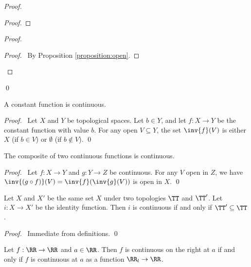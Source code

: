 \begin{proof}
\begin{proof}
    \end{proof}
    \begin{proof}
        \qedstep
        \begin{proof}
            \pf\ By Proposition \ref{proposition:open}.
        \end{proof}
    \end{proof}
    \qed
\end{proof}

\begin{theorem}
    A constant function is continuous.
\end{theorem}

\begin{proof}
    \pf\ Let $X$ and $Y$ be topological spaces. Let $b \in Y$, and let $f : X \rightarrow Y$ be the constant
    function with value $b$. For any open $V \subseteq Y$, the set $\inv{f}(V)$ is either $X$ (if $b \in V$)
    or $\emptyset$ (if $b \notin V$). \qed
\end{proof}

\begin{theorem}
    \label{theorem:continuous_composite}
    The composite of two continuous functions is continuous.
\end{theorem}

\begin{proof}
    \pf\ Let $f : X \rightarrow Y$ and $g : Y \rightarrow Z$ be continuous. For any $V$ open in $Z$,
    we have $\inv{(g \circ f)}(V) = \inv{f}(\inv{g}(V))$ is open in $X$. \qed
\end{proof}

\begin{proposition}
    Let $X$ and $X'$ be the same set $X$ under two topologies $\TT$ and $\TT'$. Let $i : X \rightarrow X'$
    be the identity function. Then $i$ is continuous if and only if $\TT' \subseteq \TT$.
\end{proposition}

\begin{proof}
    \pf\ Immediate from definitions. \qed
\end{proof}

\begin{proposition}
    Let $f : \RR \rightarrow \RR$ and $a \in \RR$. Then $f$ is continuous on the right at $a$ if and only if
    $f$ is continuous at $a$ as a function $\RR_l \rightarrow \RR$.
\end{proposition}

